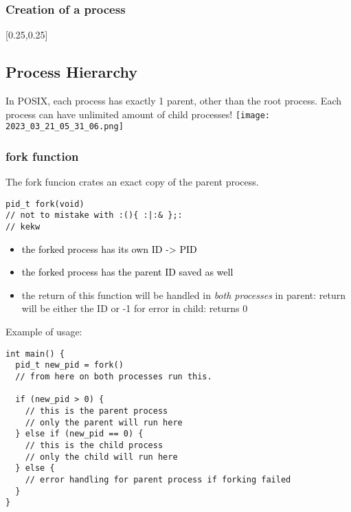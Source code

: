 \documentclass[main.tex,fontsize=8pt,paper=a4,paper=portrait,DIV=calc,]{scrartcl}
\begin{document}
\subsubsection{Creation of a process}
[0.25,0.25]

\subsection{Process Hierarchy}
In POSIX, each process has exactly 1 parent, other than the root process.\newline
Each process can have unlimited amount of child processes!\newline
\texttt{[image: 2023\_03\_21\_05\_31\_06.png]}

\subsubsection{fork function}
The fork funcion crates an exact copy of the parent process.
\begin{lstlisting}
pid_t fork(void)
// not to mistake with :(){ :|:& };:
// kekw
\end{lstlisting}
\begin{itemize}
\item \textcolor{black}{the forked process has its own ID -> PID}
\item \textcolor{black}{the forked process has the parent ID saved as well}
\item the return of this function will be handled in \emph{both processes}\newline
  in parent: return will be either the ID or -1 for error\newline
  in child: returns 0
\end{itemize} 
Example of usage:
\begin{lstlisting}
int main() {
  pid_t new_pid = fork()
  // from here on both processes run this.

  if (new_pid > 0) {
    // this is the parent process
    // only the parent will run here
  } else if (new_pid == 0) {
    // this is the child process
    // only the child will run here
  } else {
    // error handling for parent process if forking failed
  }
}
\end{lstlisting}
\end{document}
